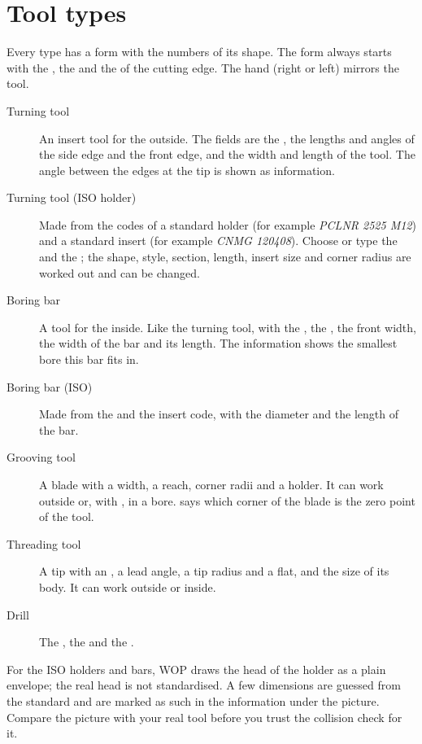 \section{Tool types}\label{sec:tools:types}
Every type has a form with the numbers of its shape. The form always starts with the , the  and the  of the cutting edge. The hand (right or left) mirrors the tool.

\begin{description}
\item[Turning tool] An insert tool for the outside. The fields are the , the lengths and angles of the side edge and the front edge, and the width and length of the tool. The angle between the edges at the tip is shown as information.
\item[Turning tool (ISO holder)] Made from the codes of a standard holder (for example \emph{PCLNR 2525 M12}) and a standard insert (for example \emph{CNMG 120408}). Choose or type the  and the ; the shape, style, section, length, insert size and corner radius are worked out and can be changed.
\item[Boring bar] A tool for the inside. Like the turning tool, with the , the , the front width, the width of the bar and its length. The information shows the smallest bore this bar fits in.
\item[Boring bar (ISO)] Made from the  and the insert code, with the diameter and the length of the bar.
\item[Grooving tool] A blade with a width, a reach, corner radii and a holder. It can work outside or, with , in a bore.  says which corner of the blade is the zero point of the tool.
\item[Threading tool] A tip with an , a lead angle, a tip radius and a flat, and the size of its body. It can work outside or inside.
\item[Drill] The , the  and the .
\end{description}

\begin{notebox}
For the ISO holders and bars, WOP draws the head of the holder as a plain envelope; the real head is not standardised. A few dimensions are guessed from the standard and are marked as such in the information under the picture. Compare the picture with your real tool before you trust the collision check for it.
\end{notebox}

